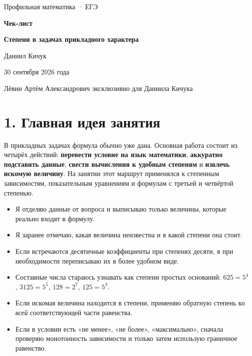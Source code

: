 \documentclass[a4paper,12pt]{article}
\newcommand{\checkitem}{\item[$\square$]}
\newcommand{\key}[1]{\textcolor{darkaccent}{\textbf{#1}}}
\begin{document}
\begin{titlepage}
\thispagestyle{empty}
\centering
\vspace*{26mm}
{\Large\textcolor{accent}{Профильная математика · ЕГЭ}\par}
\vspace{11mm}
{\fontsize{25}{30}\selectfont\bfseries Чек-лист\par}
\vspace{5mm}
{\fontsize{20}{25}\selectfont\bfseries Степени в задачах прикладного характера\par}
\vspace{18mm}
{\large Даниил Кичук\par}
\vspace{5mm}
{\normalsize 30 сентября 2026 года\par}
\vfill
{\small Лёвин Артём Александрович эксклюзивно для Даниила Кичука\par}
\vspace{12mm}
\end{titlepage}

\section*{1. Главная идея занятия}

В прикладных задачах формула обычно уже дана. Основная работа состоит из четырёх действий: \key{перевести условие на язык математики}, \key{аккуратно подставить данные}, \key{свести вычисления к удобным степеням} и \key{извлечь искомую величину}. На занятии этот маршрут применялся к степенным зависимостям, показательным уравнениям и формулам с третьей и четвёртой степенью.

\begin{itemize}
\checkitem Я отделяю данные от вопроса и выписываю только величины, которые реально входят в формулу.
\checkitem Я заранее отмечаю, какая величина неизвестна и в какой степени она стоит.
\checkitem Если встречаются десятичные коэффициенты при степенях десяти, я при необходимости переписываю их в более удобном виде.
\checkitem Составные числа стараюсь узнавать как степени простых оснований: $625=5^4$, $3125=5^5$, $128=2^7$, $125=5^3$.
\checkitem Если искомая величина находится в степени, применяю обратную степень ко \emph{всей} соответствующей части равенства.
\checkitem Если в условии есть «не менее», «не более», «максимально», сначала проверяю монотонность зависимости и только затем использую граничное равенство.
\end{itemize}
\end{document}
